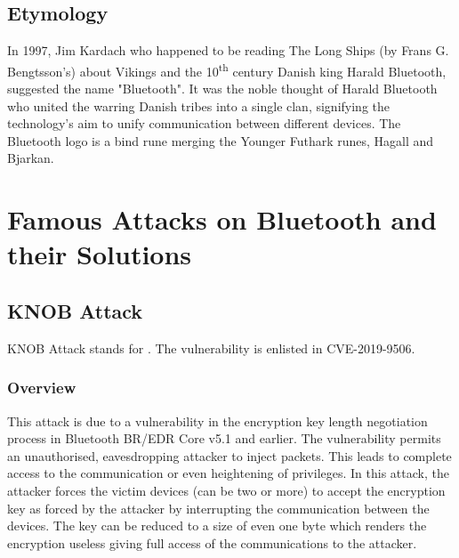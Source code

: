 \documentclass{article}
\begin{document}
\subsection{Etymology}
In 1997, Jim Kardach who happened to be reading The Long Ships (by Frans G. Bengtsson’s) about Vikings and the 10\textsuperscript{th} century Danish king Harald Bluetooth, suggested the name "Bluetooth". It was the noble thought of Harald Bluetooth\texttrademark{} who united the warring Danish tribes into a single clan, signifying the technology's aim to unify communication between different devices. The Bluetooth\texttrademark{} logo is a bind rune merging the Younger Futhark runes, Hagall and Bjarkan.\cite{wiki}


\section{Famous Attacks on Bluetooth\texttrademark{} and their Solutions}

\subsection{KNOB Attack}
KNOB Attack stands for . The vulnerability is enlisted in CVE-2019-9506.\cite{knob}
\subsubsection{Overview}
This attack is due to a vulnerability in the encryption key length negotiation process in Bluetooth\texttrademark{} BR/EDR Core v5.1 and earlier. The vulnerability permits an unauthorised, eavesdropping attacker to inject packets. This leads to complete access to the communication or even heightening of privileges. In this attack, the attacker forces the victim devices (can be two or more) to accept the encryption key as forced by the attacker by interrupting the communication between the devices. The key can be reduced to a size of even one byte which renders the encryption useless giving full access of the communications to the attacker.\cite{knobcve}
\end{document}
